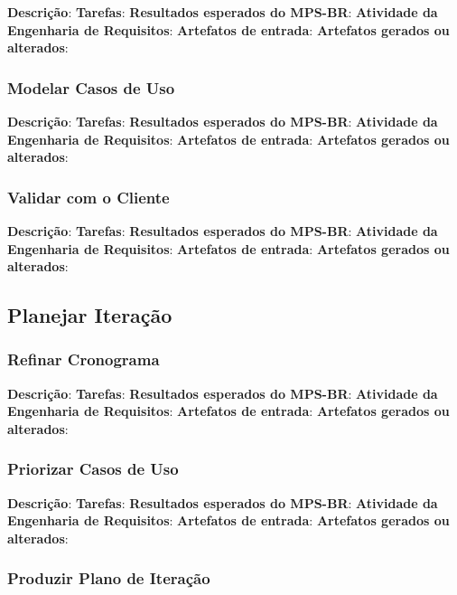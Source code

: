 \textbf{Descrição}:
\textbf{Tarefas}:
\textbf{Resultados esperados do MPS-BR}:
\textbf{Atividade da Engenharia de Requisitos}:
\textbf{Artefatos de entrada}:
\textbf{Artefatos gerados ou alterados}:

\subsubsection{Modelar Casos de Uso}

\textbf{Descrição}:
\textbf{Tarefas}:
\textbf{Resultados esperados do MPS-BR}:
\textbf{Atividade da Engenharia de Requisitos}:
\textbf{Artefatos de entrada}:
\textbf{Artefatos gerados ou alterados}:

\subsubsection{Validar com o Cliente}

\textbf{Descrição}:
\textbf{Tarefas}:
\textbf{Resultados esperados do MPS-BR}:
\textbf{Atividade da Engenharia de Requisitos}:
\textbf{Artefatos de entrada}:
\textbf{Artefatos gerados ou alterados}:

\subsection{Planejar Iteração}

\subsubsection{Refinar Cronograma}

\textbf{Descrição}:
\textbf{Tarefas}:
\textbf{Resultados esperados do MPS-BR}:
\textbf{Atividade da Engenharia de Requisitos}:
\textbf{Artefatos de entrada}:
\textbf{Artefatos gerados ou alterados}:

\subsubsection{Priorizar Casos de Uso}

\textbf{Descrição}:
\textbf{Tarefas}:
\textbf{Resultados esperados do MPS-BR}:
\textbf{Atividade da Engenharia de Requisitos}:
\textbf{Artefatos de entrada}:
\textbf{Artefatos gerados ou alterados}:

\subsubsection{Produzir Plano de Iteração}

